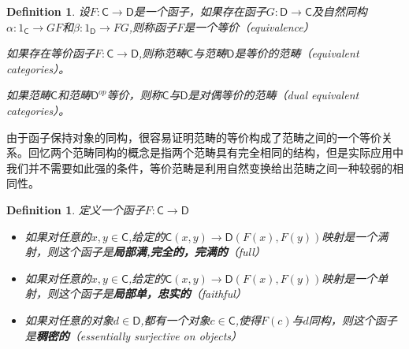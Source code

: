 \documentclass[UTF8,11pt,a4paper]{ctexart}
\newtheorem{definition}[theorem]{Definition}
\newcommand{\tbf}{\textbf}
\newcommand*{\cat}[1]{\textsf{#1}\xspace}
\newcommand{\al}{\alpha}
\newcommand{\be}{\beta}
\newcommand*{\xfunc}[4]{{#2}\colon{#3}{#1}{#4}}
\newcommand*{\func}[3]{\xfunc{\to}{#1}{#2}{#3}}
\begin{document}
\begin{definition}
设$\func{F}{\cat{C}}{\cat{D}}$是一个函子，如果存在函子$\func{G}{\cat{D}}{\cat{C}}$及自然同构$\func{\al}{1_{\cat{C}}}{GF}$和$\func{\be}{1_{\cat{D}}}{FG}$,则称函子$F$是一个等价（equivalence）

\begin{center}
\end{center}


如果存在等价函子$\func{F}{\cat{C}}{\cat{D}}$,则称范畴$\cat{C}$与范畴$\cat{D}$是等价的范畴（equivalent categories）。

如果范畴$\cat{C}$和范畴$\cat{D}^{op}$等价，则称$\cat{C}$与$\cat{D}$是对偶等价的范畴（dual equivalent categories）。
\end{definition}

由于函子保持对象的同构，很容易证明范畴的等价构成了范畴之间的一个等价关系。回忆两个范畴同构的概念是指两个范畴具有完全相同的结构，但是实际应用中我们并不需要如此强的条件，等价范畴是利用自然变换给出范畴之间一种较弱的相同性。

\begin{definition}
定义一个函子$\func{F}{\cat{C}}{\cat{D}}$
	\begin{itemize}
		\item 如果对任意的$x,y \in \cat{C}$,给定的$\cat{C}(x,y) \rightarrow \cat{D}(F(x),F(y))$映射是一个满射，则这个函子是\tbf{局部满,完全的，完满的}（full）
		\item 如果对任意的$x,y \in \cat{C}$,给定的$\cat{C}(x,y) \rightarrow \cat{D}(F(x),F(y))$映射是一个单射，则这个函子是\tbf{局部单，忠实的}（faithful）
		\item 如果对任意的对象$d \in \cat{D}$,都有一个对象$c \in \cat{C}$,使得$F(c)$与$d$同构，则这个函子是\tbf{稠密的}（essentially surjective on objects）
	\end{itemize}
\end{definition}
\end{document}
